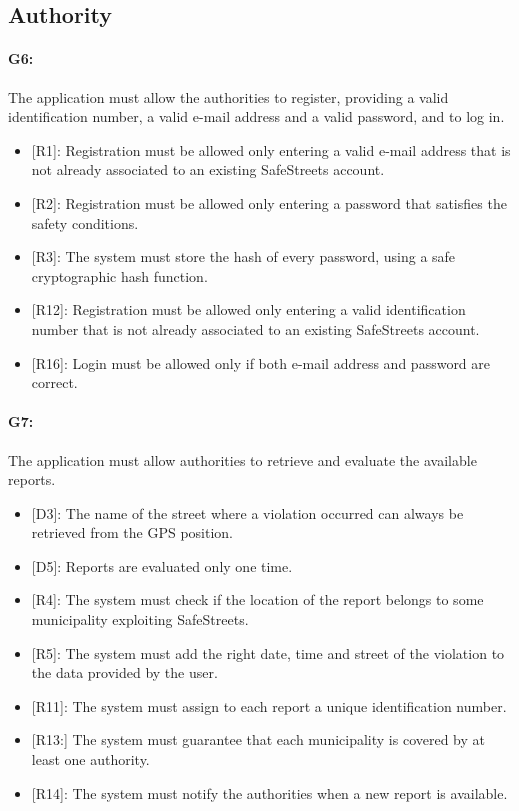 \documentclass[12pt,a4paper]{report}
\begin{document}
		\subsection{Authority}
			
			\paragraph {G6:} The application must allow the authorities to register, providing a valid identification number, a valid e-mail address and a valid password,
			and to log in.
				\begin{itemize}
					\item{[R1]}: Registration must be allowed only entering a valid e-mail address that is not already associated to an existing SafeStreets account.
					\item{[R2]}: Registration must be allowed only entering a password that satisfies the safety conditions.
					\item{[R3]}: The system must store the hash of every password, using a safe cryptographic hash function.
					\item{[R12]}: Registration must be allowed only entering a valid identification number that is not already associated to an existing SafeStreets account.
					\item{[R16]}: Login must be allowed only if both e-mail address and password are correct.
				\end{itemize}

			\paragraph {G7:} The application must allow authorities to retrieve and evaluate the available reports.
				\begin{itemize}
					\item{[D3]}: The name of the street where a violation occurred can always be retrieved from the GPS position.
					\item{[D5]}: Reports are evaluated only one time.
				\end{itemize}
				\begin{itemize}
					\item{[R4]}: The system must check if the location of the report belongs to some municipality exploiting SafeStreets.
					\item{[R5]}: The system must add the right date, time and street of the violation to the data provided by the user.
					\item{[R11]}: The system must assign to each report a unique identification number.
					\item{[R13:]} The system must guarantee that each municipality is covered by at least one authority.
					\item{[R14]}: The system must notify the authorities when a new report is available.
				\end{itemize}
\end{document}
